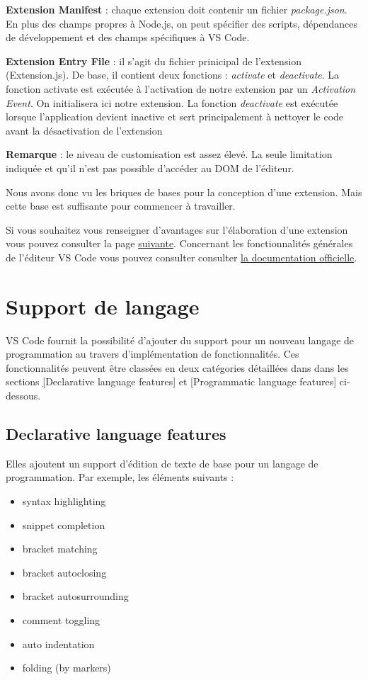 \documentclass[
    iict, %
    il, %
]{heig-tb}
\begin{document}
\textbf{Extension Manifest} :
chaque extension doit contenir un fichier \emph{package.json}. En plus des champs propres à Node.js, on peut spécifier des scripts, dépendances de développement et des champs spécifiques à VS Code.

\textbf{Extension Entry File} :
il s'agit du fichier prinicipal de l'extension (Extension.js).
De base, il contient deux fonctions : \emph{activate} et \emph{deactivate}.
La fonction activate est exécutée à l'activation de notre extension par un \emph{Activation Event}. On initialisera ici notre extension.
La fonction \emph{deactivate} est exécutée lorsque l'application devient inactive et sert principalement à nettoyer le code avant la désactivation de l'extension

\textbf{Remarque} : le niveau de customisation est assez élevé. La seule limitation indiquée et qu'il n'est pas possible d'accéder au DOM de l'éditeur.

Nous avons donc vu les briques de bases pour la conception d'une extension. Mais cette base est suffisante pour commencer à travailler.

Si vous souhaitez vous renseigner d'avantages sur l'élaboration d'une extension vous pouvez consulter la page \href{https://code.visualstudio.com/api}{suivante}.
Concernant les fonctionnalités générales de l'éditeur VS Code vous pouvez consulter consulter \href{https://code.visualstudio.com/docs}{la documentation officielle}.

\section{Support de langage}
VS Code fournit la possibilité d'ajouter du support pour un nouveau langage de programmation au travers d'implémentation de fonctionnalités. Ces fonctionnalités peuvent être classées en deux catégories détaillées
dans dans les sections \hyperref[Declarative language features][Declarative language features] et \hyperref[Programmatic language features][Programmatic language features] ci-dessous.

\subsection{Declarative language features}\label{Declarative language features}
Elles ajoutent un support d'édition de texte de base pour un langage de programmation.
Par exemple, les éléments suivants :

\begin{itemize}
    \item syntax highlighting
    \item snippet completion
    \item bracket matching
    \item bracket autoclosing
    \item bracket autosurrounding
    \item comment toggling
    \item auto indentation
    \item folding (by markers)
\end{itemize}
\end{document}
